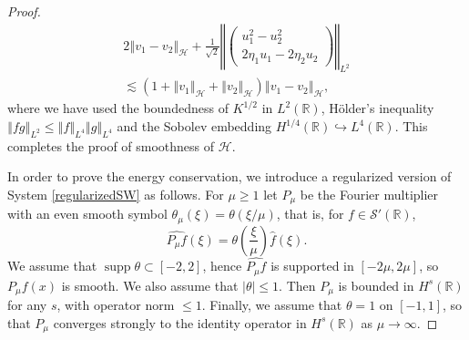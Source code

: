 \documentclass[reqno,12pt,a4paper]{article}
\theoremstyle{plain}
\newcommand{\R}{\mathbb{R}}
\newcommand{\abs}[1]{\vert #1 \vert}
\newcommand{\norm}[1]{\left\Vert #1 \right\Vert}
\DeclareMathOperator{\supp}{supp}
\begin{document}
\begin{proof}
\begin{multline*}
    2
    \norm{ v_1 - v_2 }_{\mathcal H}
    +
    \frac 1{\sqrt 2}
    \norm{
        \begin{pmatrix}
            u_1^2 - u_2^2
            \\
            2 \eta_1 u_1 - 2 \eta_2 u_2
        \end{pmatrix}
    }_{L^2}
    \\
    \lesssim
    \left(
        1
        +
        \norm{ v_1 }_{\mathcal H}
        +
        \norm{ v_2 }_{\mathcal H}
    \right)
    \norm{ v_1 - v_2 }_{\mathcal H}
    ,
\end{multline*}
where we have used the boundedness of $K^{1/2}$ in $L^2(\R)$,
H\"older's inequality
\(
    \norm{fg}_{L^2}
    \leqslant
    \norm{f}_{L^4}
    \norm{g}_{L^4}
\)
and the Sobolev embedding $H^{1/4}(\R) \hookrightarrow L^4(\R)$.
This completes the proof of smoothness of $\mathcal H$.


In order to prove the energy conservation,
we introduce a regularized version  of System \eqref{regularizedSW} as follows.
%
%
For $\mu \geqslant 1$ let $P_\mu$
be the Fourier multiplier with an even smooth symbol $\theta_\mu(\xi) = \theta(\xi/\mu)$,
that is, for $f \in \mathcal S'(\R)$,
\[
    \widehat{P_\mu f}(\xi) = \theta\left( \frac{\xi}{\mu} \right) \widehat f(\xi)
    .
\]
We assume that $\supp\theta \subset [-2,2]$,
hence $\widehat{P_\mu f}$ is supported in $[-2\mu,2\mu]$, so $P_\mu f(x)$ is smooth.
We also assume that $\abs{\theta} \leqslant 1$.
Then $P_\mu$ is bounded in $H^s(\R)$ for any $s$, with operator norm $\leqslant 1$. 
Finally, we assume that $\theta = 1$ on $[-1, 1]$,
so that $P_\mu$ converges strongly to the identity operator
in $H^s(\R)$ as $\mu \to \infty$.



\end{proof}
\end{document}
